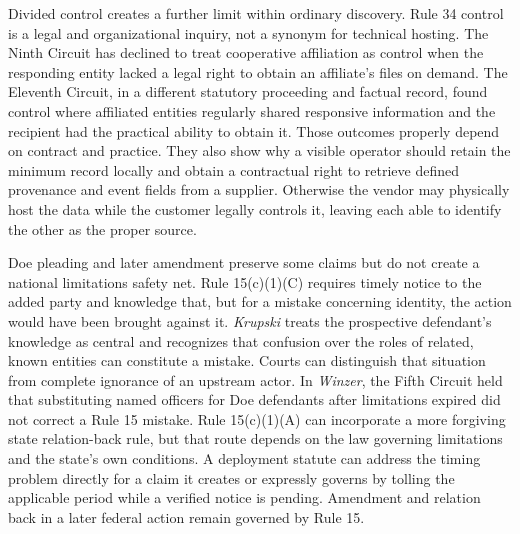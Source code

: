 Divided control creates a further limit within ordinary discovery. Rule 34 control is a legal and organizational inquiry, not a synonym for technical hosting. The Ninth Circuit has declined to treat cooperative affiliation as control when the responding entity lacked a legal right to obtain an affiliate's files on demand. The Eleventh Circuit, in a different statutory proceeding and factual record, found control where affiliated entities regularly shared responsive information and the recipient had the practical ability to obtain it. Those outcomes properly depend on contract and practice. They also show why a visible operator should retain the minimum record locally and obtain a contractual right to retrieve defined provenance and event fields from a supplier. Otherwise the vendor may physically host the data while the customer legally controls it, leaving each able to identify the other as the proper source.

Doe pleading and later amendment preserve some claims but do not create a national limitations safety net. Rule 15(c)(1)(C) requires timely notice to the added party and knowledge that, but for a mistake concerning identity, the action would have been brought against it. \emph{Krupski} treats the prospective defendant's knowledge as central and recognizes that confusion over the roles of related, known entities can constitute a mistake. Courts can distinguish that situation from complete ignorance of an upstream actor. In \emph{Winzer}, the Fifth Circuit held that substituting named officers for Doe defendants after limitations expired did not correct a Rule 15 mistake. Rule 15(c)(1)(A) can incorporate a more forgiving state relation-back rule, but that route depends on the law governing limitations and the state's own conditions. A deployment statute can address the timing problem directly for a claim it creates or expressly governs by tolling the applicable period while a verified notice is pending. Amendment and relation back in a later federal action remain governed by Rule 15.


